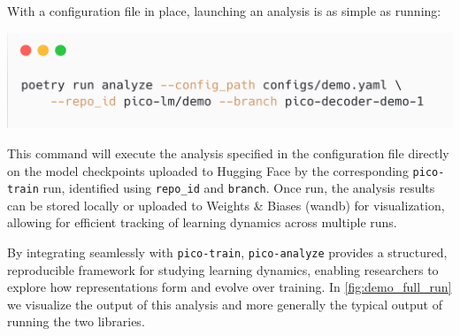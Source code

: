 With a configuration file in place, launching an analysis is as simple as running:

\begin{center}
    \includegraphics[width=0.7\columnwidth]{chapters/pico/figures/demo/demo_run_analyze.png}
\end{center}

This command will execute the analysis specified in the configuration file directly on the model checkpoints uploaded to Hugging Face by the corresponding \texttt{pico-train} run, identified using \verb|repo_id| and \verb|branch|. Once run, the analysis results can be stored locally or uploaded to Weights \& Biases (wandb) \citep{wandb} for visualization, allowing for efficient tracking of learning dynamics across multiple runs.  

By integrating seamlessly with \texttt{pico-train}, \texttt{pico-analyze} provides a structured, reproducible framework for studying learning dynamics, enabling researchers to explore how representations form and evolve over training. In \cref{fig:demo_full_run} we visualize the output of this analysis and more generally the typical output of running the two libraries. 

